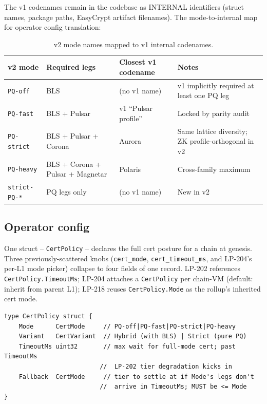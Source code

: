 The v1 codenames remain in the codebase as INTERNAL identifiers
(struct names, package paths, EasyCrypt artifact filenames). The
mode-to-internal map for operator config translation:

\begin{table}[h]
\centering
\small
\begin{tabular}{@{}llll@{}}
\toprule
\textbf{v2 mode} & \textbf{Required legs} & \textbf{Closest v1 codename} & \textbf{Notes} \\
\midrule
\texttt{PQ-off} & BLS & (no v1 name) & v1 implicitly required at least one PQ leg \\
\texttt{PQ-fast} & BLS + Pulsar & v1 ``Pulsar profile'' & Locked by parity audit \\
\texttt{PQ-strict} & BLS + Pulsar + Corona & Aurora & Same lattice diversity; ZK profile-orthogonal in v2 \\
\texttt{PQ-heavy} & BLS + Corona + Pulsar + Magnetar & Polaris & Cross-family maximum \\
\texttt{strict-PQ-*} & PQ legs only & (no v1 name) & New in v2 \\
\bottomrule
\end{tabular}
\caption{v2 mode names mapped to v1 internal codenames.}
\label{tab:v1-v2}
\end{table}

\subsection{Operator config}

One struct -- \texttt{CertPolicy} -- declares the full cert posture
for a chain at genesis. Three previously-scattered knobs
(\texttt{cert\_mode}, \texttt{cert\_timeout\_ms}, and LP-204's per-L1
mode picker) collapse to four fields of one record. LP-202 references
\texttt{CertPolicy.TimeoutMs}; LP-204 attaches a \texttt{CertPolicy}
per chain-VM (default: inherit from parent L1); LP-218 reuses
\texttt{CertPolicy.Mode} as the rollup's inherited cert mode.

\begin{verbatim}
type CertPolicy struct {
    Mode      CertMode     // PQ-off|PQ-fast|PQ-strict|PQ-heavy
    Variant   CertVariant  // Hybrid (with BLS) | Strict (pure PQ)
    TimeoutMs uint32       // max wait for full-mode cert; past TimeoutMs
                          //  LP-202 tier degradation kicks in
    Fallback  CertMode     // tier to settle at if Mode's legs don't
                          //  arrive in TimeoutMs; MUST be <= Mode
}
\end{verbatim}

